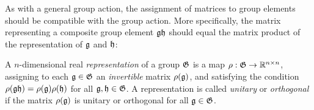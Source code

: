As with a general group action, the assignment of matrices to group elements should be compatible with the group action.
More specifically, the matrix representing a composite group element ${\mathfrak{g}} {\mathfrak{h}}$ should equal the matrix product of the representation of ${\mathfrak{g}}$ and ${\mathfrak{h}}$:


\begin{tcolorbox}[width=\linewidth,
                  boxsep=0pt,
                  left=7.5pt,
                  right=7.5pt,
                  top=7.5pt,
                  bottom=7.5pt,
                  arc=0pt,
                  boxrule=0pt,toprule=0pt,
                  colback=boxgray,
                  ]%
    A $n$-dimensional real \emph{representation} of a group ${\mathfrak{G}}$ is a map $\rho : {\mathfrak{G}} \rightarrow \mathbb{R}^{n \times n}$, assigning to each ${\mathfrak{g}} \in {\mathfrak{G}}$ an \emph{invertible} matrix $\rho({\mathfrak{g}})$, and satisfying the condition $\rho({\mathfrak{g}} {\mathfrak{h}}) = \rho({\mathfrak{g}}) \rho({\mathfrak{h}})$ for all ${\mathfrak{g}}, {\mathfrak{h}} \in {\mathfrak{G}}$.
    A representation is called \emph{unitary} or \emph{orthogonal} if the matrix $\rho({\mathfrak{g}})$ is unitary or orthogonal for all ${\mathfrak{g}} \in {\mathfrak{G}}$.
\end{tcolorbox}

